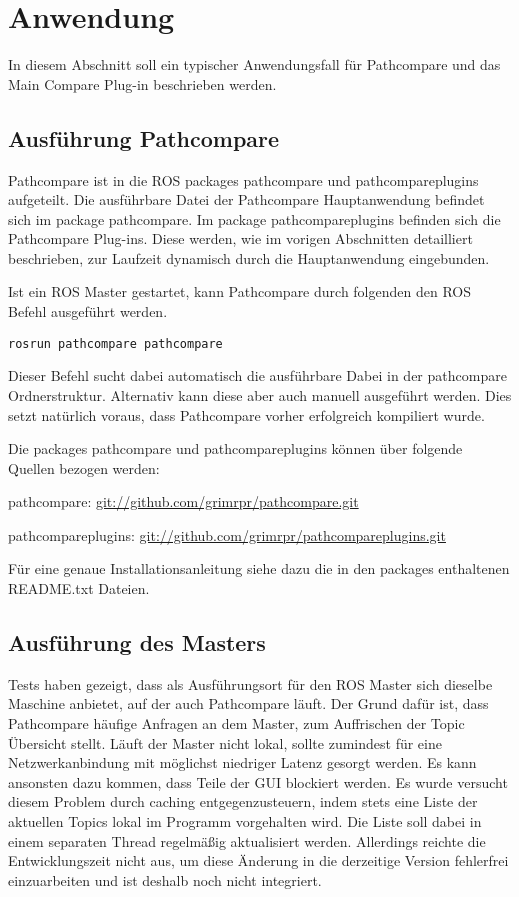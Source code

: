 \chapter{Anwendung}
\label{sec:andwendung}
In diesem Abschnitt soll ein typischer Anwendungsfall für Pathcompare und das
Main Compare Plug-in beschrieben werden. 

\section{Ausführung Pathcompare}

Pathcompare ist in die ROS packages pathcompare und pathcompareplugins
aufgeteilt. Die ausführbare Datei der Pathcompare Hauptanwendung befindet sich
im package pathcompare. Im package pathcompareplugins befinden sich die
Pathcompare Plug-ins. Diese werden, wie im vorigen Abschnitten detailliert
beschrieben, zur Laufzeit dynamisch durch die Hauptanwendung eingebunden.

Ist ein ROS Master gestartet, kann Pathcompare durch folgenden den ROS Befehl
ausgeführt werden.

\begin{lstlisting}[caption=Starten von Pathcompare, label=lst:rosrun]
rosrun pathcompare pathcompare
\end{lstlisting}

Dieser Befehl sucht dabei automatisch die ausführbare Dabei in der pathcompare
Ordnerstruktur. Alternativ kann diese aber auch manuell ausgeführt werden.
Dies setzt natürlich voraus, dass Pathcompare vorher erfolgreich kompiliert
wurde. 

Die packages pathcompare und pathcompareplugins können über folgende Quellen bezogen
werden:

pathcompare:
\url{git://github.com/grimrpr/pathcompare.git}

pathcompareplugins:
\url{git://github.com/grimrpr/pathcompareplugins.git}


Für eine genaue Installationsanleitung siehe dazu 
die in den packages enthaltenen README.txt Dateien.


\section{Ausführung des Masters}

Tests haben gezeigt, dass als Ausführungsort für den ROS Master sich dieselbe
Maschine anbietet, auf der auch Pathcompare läuft. Der Grund dafür ist, dass
Pathcompare häufige Anfragen an dem Master, zum Auffrischen der Topic
Übersicht stellt. Läuft der Master nicht lokal, sollte zumindest für eine
Netzwerkanbindung mit möglichst niedriger Latenz gesorgt werden. Es kann
ansonsten dazu kommen, dass Teile der GUI blockiert werden. Es wurde versucht
diesem Problem durch caching entgegenzusteuern, indem stets eine Liste der
aktuellen Topics lokal im Programm vorgehalten wird. Die Liste soll dabei in einem
separaten Thread regelmäßig aktualisiert werden. Allerdings reichte die
Entwicklungszeit nicht aus, um diese Änderung in die derzeitige Version
fehlerfrei einzuarbeiten und ist deshalb noch nicht integriert. 


